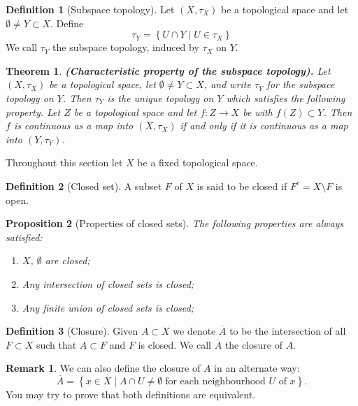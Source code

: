 \documentclass[11pt,a4paper]{article}
\theoremstyle{definition}
\newtheorem{definition}{Definition}[section]
\newtheorem{remark}{Remark}[section]
\theoremstyle{plain}
\newtheorem{theorem}{Theorem}[section]
\newtheorem{proposition}[theorem]{Proposition}
\newcommand{\set}[2]{ \left\{ #1 \mid #2 \right\} }
\renewcommand{\tt}[1]{\textnormal{\textbf{(#1).}}} %
\begin{document}
  \begin{definition}[Subspace topology]
    Let $(X,\tau_X)$ be a topological space and let $\emptyset \neq Y \subset 
    X$. Define
    \[
      \tau_Y = \set{U \cap Y}{U \in \tau_X}
    \]
    We call $\tau_Y$ the subspace topology, induced by $\tau_X$ on $Y$.
  \end{definition}

  \begin{theorem}
    \tt{Characteristic property of the subspace topology}
    Let $(X, \tau_X)$
    be a topological space, let $\emptyset \neq Y \subset X$, and write 
    $\tau_Y$ for the subspace topology on $Y$. Then $\tau_Y$ is the unique 
    topology on $Y$ which satisfies the following property. Let $Z$
    be a topological space and let $f \colon Z \to X$ be with 
    $f(Z) \subset Y$. Then $f$ is continuous as a map into $(X, \tau_X)$ if 
    and only if it is continuous as a map into $(Y, \tau_Y)$.
  \end{theorem}

  Throughout this section let $X$ be a fixed topological space.

  \begin{definition}[Closed set]
    A subset $F$ of $X$ is said to be closed if $F^c = X \setminus F$ is open.
  \end{definition}

  \begin{proposition}[Properties of closed sets]
    The following properties are always satisfied:
    \begin{enumerate}
      \item[(1)] $X$, $\emptyset$ are closed;
      \item[(2)] Any intersection of closed sets is closed;
      \item[(3)] Any finite union of closed sets is closed;
    \end{enumerate}
  \end{proposition}

  \begin{definition}[Closure]
    Given $A \subset X$ we denote $\overline{A}$ to be the intersection of
    all $F \subset X$ such that $A \subset F$ and $F$ is closed. We call
    $\overline{A}$ the closure of $A$.
  \end{definition}

  \begin{remark}\label{rmk:closure}
    We can also define the closure of $A$ in an alternate way:
    \[
      \overline{A} = \set{x \in X}{A \cap U \neq \emptyset \;\text{for each 
      neighbourhood $U$ of $x$}}.
    \]
    You may try to prove that both definitions are equivalent.
  \end{remark}
\end{document}
